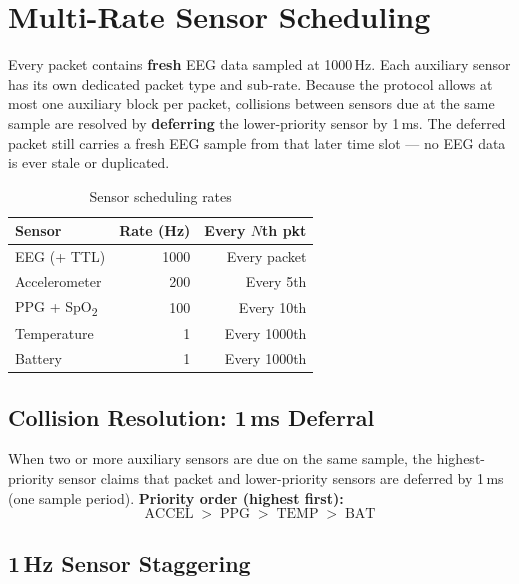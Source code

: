 \documentclass[11pt,a4paper]{article}
\begin{document}
\section{Multi-Rate Sensor Scheduling}
\label{sec:scheduling}

Every packet contains \textbf{fresh} EEG data sampled at 1000\,Hz.  Each auxiliary sensor has its own dedicated packet type and sub-rate.  Because the protocol allows at most one auxiliary block per packet, collisions between sensors due at the same sample are resolved by \textbf{deferring} the lower-priority sensor by 1\,ms.  The deferred packet still carries a fresh EEG sample from that later time slot --- no EEG data is ever stale or duplicated.

\begin{table}[H]
\centering
\caption{Sensor scheduling rates}
\label{tab:schedule}
\begin{tabular}{|l|r|r|}
\hline
\textbf{Sensor} & \textbf{Rate (Hz)} & \textbf{Every $N$th pkt}\\\hline
\hline
EEG (+ TTL) & 1000 & Every packet\\
Accelerometer & 200 & Every 5th\\
PPG + SpO\textsubscript{2} & 100 & Every 10th\\
Temperature & 1 & Every 1000th\\
Battery & 1 & Every 1000th\\
\hline
\end{tabular}
\end{table}

\subsection{\texorpdfstring{Collision Resolution: 1\,ms Deferral}{Collision Resolution: 1 ms Deferral}}

When two or more auxiliary sensors are due on the same sample, the highest-priority sensor claims that packet and lower-priority sensors are deferred by 1\,ms (one sample period).
\medskip\noindent
\textbf{Priority order (highest first):}
\[
\text{ACCEL} \;>\; \text{PPG} \;>\; \text{TEMP} \;>\; \text{BAT}
\]

\subsection{\texorpdfstring{1\,Hz Sensor Staggering}{1 Hz Sensor Staggering}}
\end{document}
